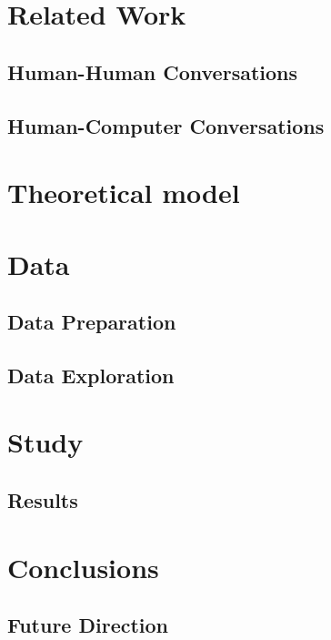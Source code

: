 \documentclass[copyright,masters]{cslu-thesis}
\begin{document}
\chapter{Related Work}

\section{Human-Human Conversations}

\section{Human-Computer Conversations}

\chapter{Theoretical model}

\chapter{Data}

\section{Data Preparation}

\section{Data Exploration}

\chapter {Study}

\section{Results}

\chapter{Conclusions}

\section{Future Direction}



\appendix


\nocite{*} %


\end{document}
